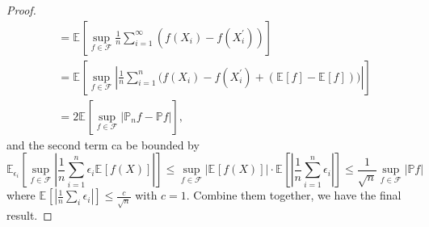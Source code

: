\begin{proof}
\[\begin{split}
			 & = \mathbb{E}_{}\left[\sup _{f\in \mathscr{F} } \frac{1}{n}\sum_{i=1}^{\infty} ( f(X_i) - f(X_i^{\prime} )) \right]                                                                                              \\
			 & = \mathbb{E}_{}\left[\sup _{f\in \mathscr{F} } \left\vert \frac{1}{n}\sum_{i=1}^{n} \big( f(X_i) - f(X_i^{\prime} ) + (\mathbb{E}_{}\left[f \right] - \mathbb{E}_{}\left[f \right] ) \big) \right\vert  \right] \\
			 & = 2 \mathbb{E}_{}\left[\sup _{f\in \mathscr{F} } \left\vert \mathbb{P} _n f - \mathbb{P} f \right\vert  \right] ,
		\end{split}
	\]
	and the second term ca be bounded by
	\[
		\mathbb{E}_{\epsilon _i}\left[\sup _{f\in \mathscr{F} } \left\vert \frac{1}{n}\sum_{i=1}^{n} \epsilon _i \mathbb{E}_{}\left[f(X) \right] \right\vert \right]
		\leq \sup _{f\in \mathscr{F} } \left\vert \mathbb{E}_{}\left[f(X) \right]  \right\vert \cdot \mathbb{E}_{}\left[\left\vert \frac{1}{n} \sum_{i=1}^{n} \epsilon _i \right\vert \right]
		\leq \frac{1}{\sqrt{n} } \sup _{f\in \mathscr{F} } \vert \mathbb{P} f \vert
	\]
	where \(\mathbb{E}_{}\left[\left\vert \frac{1}{n} \sum_{i} \epsilon _i \right\vert \right] \leq \frac{c}{\sqrt{n} } \) with \(c = 1\). Combine them together, we have the final result.
\end{proof}